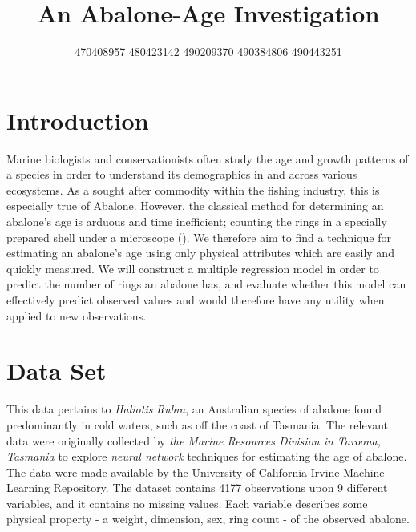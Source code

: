 \documentclass[letterpaper,9pt,twocolumn,twoside,]{pinp}
\title{An Abalone-Age Investigation}
\author[]{\textbar{} 470408957 \textbar{} 480423142 \textbar{} 490209370
\textbar{} 490384806 \textbar{} 490443251 \textbar{}}
\begin{document}
\verticaladjustment{-2pt}

\maketitle
\thispagestyle{firststyle}



\hypertarget{introduction}{%
\section{Introduction}\label{introduction}}

Marine biologists and conservationists often study the age and growth
patterns of a species in order to understand its demographics in and
across various ecosystems. As a sought after commodity within the
fishing industry, this is especially true of Abalone. However, the
classical method for determining an abalone's age is arduous and time
inefficient; counting the rings in a specially prepared shell under a
microscope (\cite{Dua:2019}). We therefore aim to find a technique for
estimating an abalone's age using only physical attributes which are
easily and quickly measured. We will construct a multiple regression
model in order to predict the number of rings an abalone has, and
evaluate whether this model can effectively predict observed values and
would therefore have any utility when applied to new observations.

\hypertarget{data-set}{%
\section{Data Set}\label{data-set}}

This data pertains to \emph{Haliotis} \emph{Rubra}, an Australian
species of abalone found predominantly in cold waters, such as off the
coast of Tasmania. The relevant data were originally collected by
\emph{the Marine Resources Division in Taroona, Tasmania} to explore
\emph{neural network} techniques for estimating the age of abalone. The
data were made available by the University of California Irvine Machine
Learning Repository. The dataset contains 4177 observations upon 9
different variables, and it contains no missing values. Each variable
describes some physical property - a weight, dimension, sex, ring count
- of the observed abalone.
\end{document}
